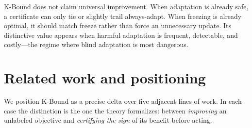 \documentclass[conference]{IEEEtran}
\theoremstyle{plain}
\theoremstyle{definition}
\begin{document}
\begin{table}[t]\centering\footnotesize
\caption{\textbf{Reviewer-safe dataset/regime evidence summary.}
Numbers are regret-to-oracle (lower is better). ``Not uniform'' means the corresponding
heuristic/AETTA/ATC/agreement artifact is not available as an apples-to-apples column for
that dataset, so we do not fill the cell by analogy. Natural-shift headline rows use
Protocols~G / H v2 / M v2 (dev-lock yaml in \texttt{research\_lock/}). The deployed
Office-Home adapter audit (Table~\ref{tab:officehome}) remains a separate null.
ImageNet-R values are from the winning split only and are therefore not a headline win.}
\label{tab:regime-summary}
\end{table}

K-Bound does not claim universal improvement. When adaptation is already safe, a
certificate can only tie or slightly trail always-adapt. When freezing is already
optimal, it should match freeze rather than force an unnecessary update. Its
distinctive value appears when harmful adaptation is frequent, detectable, and
costly---the regime where blind adaptation is most dangerous.

\section{Related work and positioning}
We position K-Bound as a precise delta over five adjacent lines of work. In each case the
distinction is the one the theory formalizes: between \emph{improving} an unlabeled objective
and \emph{certifying the sign} of its benefit before acting.
\end{document}
